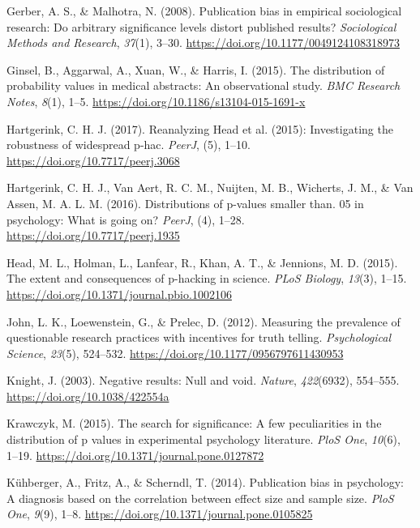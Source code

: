 \documentclass[
  12pt,
]{article}
\begin{document}
\leavevmode\hypertarget{ref-Gerber2008}{}%
Gerber, A. S., \& Malhotra, N. (2008). Publication bias in empirical
sociological research: Do arbitrary significance levels distort
published results? \emph{Sociological Methods and Research},
\emph{37}(1), 3--30. \url{https://doi.org/10.1177/0049124108318973}

\leavevmode\hypertarget{ref-Ginsel}{}%
Ginsel, B., Aggarwal, A., Xuan, W., \& Harris, I. (2015). The
distribution of probability values in medical abstracts: An
observational study. \emph{BMC Research Notes}, \emph{8}(1), 1--5.
\url{https://doi.org/10.1186/s13104-015-1691-x}

\leavevmode\hypertarget{ref-Hartgerink2017}{}%
Hartgerink, C. H. J. (2017). Reanalyzing Head et al. (2015):
Investigating the robustness of widespread p-hac. \emph{PeerJ}, (5),
1--10. \url{https://doi.org/10.7717/peerj.3068}

\leavevmode\hypertarget{ref-Hartgerink2016}{}%
Hartgerink, C. H. J., Van Aert, R. C. M., Nuijten, M. B., Wicherts, J.
M., \& Van Assen, M. A. L. M. (2016). Distributions of p-values smaller
than. 05 in psychology: What is going on? \emph{PeerJ}, (4), 1--28.
\url{https://doi.org/10.7717/peerj.1935}

\leavevmode\hypertarget{ref-Head2015}{}%
Head, M. L., Holman, L., Lanfear, R., Khan, A. T., \& Jennions, M. D.
(2015). The extent and consequences of p-hacking in science. \emph{PLoS
Biology}, \emph{13}(3), 1--15.
\url{https://doi.org/10.1371/journal.pbio.1002106}

\leavevmode\hypertarget{ref-John}{}%
John, L. K., Loewenstein, G., \& Prelec, D. (2012). Measuring the
prevalence of questionable research practices with incentives for truth
telling. \emph{Psychological Science}, \emph{23}(5), 524--532.
\url{https://doi.org/10.1177/0956797611430953}

\leavevmode\hypertarget{ref-Knight}{}%
Knight, J. (2003). Negative results: Null and void. \emph{Nature},
\emph{422}(6932), 554--555. \url{https://doi.org/10.1038/422554a}

\leavevmode\hypertarget{ref-Krawczyk}{}%
Krawczyk, M. (2015). The search for significance: A few peculiarities in
the distribution of p values in experimental psychology literature.
\emph{PloS One}, \emph{10}(6), 1--19.
\url{https://doi.org/10.1371/journal.pone.0127872}

\leavevmode\hypertarget{ref-Kuhberger}{}%
Kühberger, A., Fritz, A., \& Scherndl, T. (2014). Publication bias in
psychology: A diagnosis based on the correlation between effect size and
sample size. \emph{PloS One}, \emph{9}(9), 1--8.
\url{https://doi.org/10.1371/journal.pone.0105825}
\end{document}
